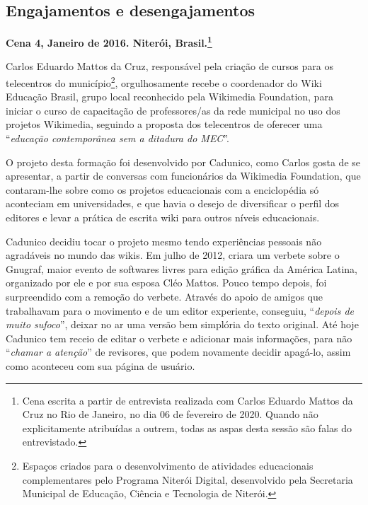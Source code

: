 \subsection{Engajamentos e desengajamentos}

\textbf{Cena 4, Janeiro de 2016. Niterói, Brasil.\footnote{Cena escrita a partir de entrevista realizada com Carlos Eduardo Mattos da Cruz no Rio de Janeiro, no dia 06 de fevereiro de 2020. Quando não explicitamente atribuídas a outrem, todas as aspas desta sessão são falas do entrevistado.}}

Carlos Eduardo Mattos da Cruz, responsável pela criação de cursos para os telecentros do município\footnote{Espaços criados para o desenvolvimento de atividades educacionais complementares pelo Programa Niterói Digital, desenvolvido pela Secretaria Municipal de Educação, Ciência e Tecnologia de Niterói.}, orgulhosamente recebe o coordenador do Wiki Educação Brasil, grupo local reconhecido pela Wikimedia Foundation, para iniciar o curso de capacitação de professores/as da rede municipal no uso dos projetos Wikimedia, seguindo a proposta dos telecentros de oferecer uma ``\textit{educação contemporânea sem a ditadura do MEC}''.

O projeto desta formação foi desenvolvido por Cadunico, como Carlos gosta de se apresentar, a partir de conversas com funcionários da Wikimedia Foundation, que contaram-lhe sobre como os projetos educacionais com a enciclopédia só aconteciam em universidades, e que havia o desejo de diversificar o perfil dos editores e levar a prática de escrita wiki para outros níveis educacionais.

Cadunico decidiu tocar o projeto mesmo tendo experiências pessoais não agradáveis no mundo das wikis. Em julho de 2012, criara um verbete sobre o Gnugraf, maior evento de softwares livres para edição gráfica da América Latina, organizado por ele e por sua esposa Cléo Mattos. Pouco tempo depois, foi surpreendido com a remoção do verbete. Através do apoio de amigos que trabalhavam para o movimento e de um editor experiente, conseguiu, ``\textit{depois de muito sufoco}'', deixar no ar uma versão bem simplória do texto original. Até hoje Cadunico tem receio de editar o verbete e adicionar mais informações, para não ``\textit{chamar a atenção}'' de revisores, que podem novamente decidir apagá-lo, assim como aconteceu com sua página de usuário.

